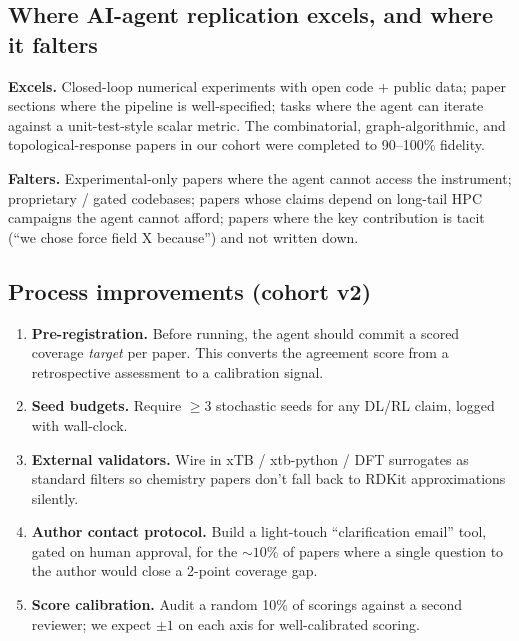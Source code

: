 \subsection{Where AI-agent replication excels, and where it falters}
\textbf{Excels.} Closed-loop numerical experiments with open code + public
data; paper sections where the pipeline is well-specified; tasks where
the agent can iterate against a unit-test-style scalar metric. The
combinatorial, graph-algorithmic, and topological-response papers in our
cohort were completed to 90--100\% fidelity.

\textbf{Falters.} Experimental-only papers where the agent cannot access the
instrument; proprietary / gated codebases; papers whose claims depend on
long-tail HPC campaigns the agent cannot afford; papers where the key
contribution is tacit (``we chose force field X because'') and not written down.

\subsection{Process improvements (cohort v2)}
\begin{enumerate}
\item \textbf{Pre-registration.} Before running, the agent should commit a
scored coverage \emph{target} per paper. This converts the agreement score
from a retrospective assessment to a calibration signal.
\item \textbf{Seed budgets.} Require $\geq 3$ stochastic seeds for any DL/RL
claim, logged with wall-clock.
\item \textbf{External validators.} Wire in xTB / xtb-python / DFT surrogates
as standard filters so chemistry papers don't fall back to RDKit
approximations silently.
\item \textbf{Author contact protocol.} Build a light-touch
``clarification email'' tool, gated on human approval, for the $\sim 10\%$ of
papers where a single question to the author would close a 2-point coverage
gap.
\item \textbf{Score calibration.} Audit a random 10\% of scorings against a
second reviewer; we expect $\pm 1$ on each axis for well-calibrated scoring.
\end{enumerate}



